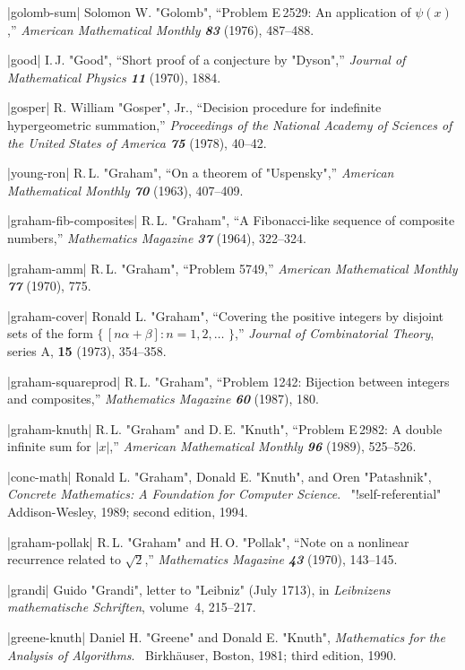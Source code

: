 \bib|golomb-sum|%
Solomon W. "Golomb", ``Problem E\,2529: An application of $\psi(x)$,''
{\sl American Mathematical Monthly\/ \bf83} (1976), 487--488.

\bib|good|%
I.\,J. "Good", ``Short proof of a conjecture by "Dyson",'' {\sl Journal
of Mathematical Physics\/ \bf11} (1970), 1884.

\bib|gosper|%
R. William "Gosper", Jr., ``Decision procedure for indefinite hypergeometric
summation,'' {\sl Proceedings of the National Academy of Sciences of the
United States of America\/
\bf75} (1978), 40--42.

\bib|young-ron|%
R.\,L. "Graham", ``On a theorem of "Uspensky",''
{\sl American Mathematical Monthly\/ \bf70} (1963), 407--409.

\bib|graham-fib-composites|%
R.\,L. "Graham", ``A Fibonacci-like sequence of composite numbers,''
{\sl Mathematics Magazine\/ \bf37} (1964), 322--324.

\bib|graham-amm|%
R.\,L. "Graham", ``Problem 5749,''
{\sl American Mathematical Monthly\/ \bf77} (1970), 775.

\bib|graham-cover|%
Ronald L. "Graham", ``Covering the positive integers by disjoint sets of the
form $\{\,[n\alpha+\beta]:n=1,2,\ldots\,\,\}$,''
{\sl Journal of Combinatorial Theory}, series A, {\bf15} (1973), 354--358.

\bib|graham-squareprod|%
R.\,L. "Graham", ``Problem 1242: Bijection between integers and composites,''
{\sl Mathematics Magazine\/ \bf60} (1987), 180.

\bib|graham-knuth|%
R.\,L. "Graham" and D.\,E. "Knuth", ``Problem E\,2982: A double
infinite sum for $\vert x\vert$,''
{\sl American Mathematical Monthly\/ \bf96} (1989), 525--526.

\bib|conc-math|%
Ronald L. "Graham", Donald E. "Knuth", and Oren "Patashnik", {\sl Concrete
Mathematics: A Foundation for Computer Science}. \
"!self-referential"
Addison-Wesley, 1989; second edition, 1994.

\bib|graham-pollak|%
R.\,L. "Graham" and H.\,O. "Pollak", ``Note on a nonlinear recurrence related
to $\sqrt2$,'' {\sl Mathematics Magazine\/ \bf43} (1970), 143--145.

\bib|grandi|%
Guido "Grandi", letter to "Leibniz" (July 1713), in
{\sl Leibnizens mathematische Schriften}, volume~4, 215--217.

\bib|greene-knuth|%
Daniel H. "Greene" and Donald E. "Knuth", {\sl Mathematics for the
Analysis of Algorithms}. \
Birkh\"auser, Boston, 1981; third edition, 1990.

